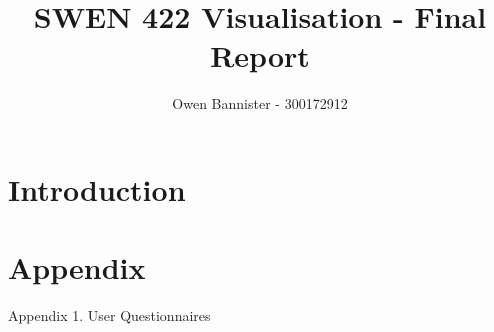 \documentclass[11pt, a4paper]{CRPITStyle}
\title{SWEN 422 Visualisation - Final Report}
\author{Owen Bannister - 300172912}
\begin{document}
\maketitle

\begin{abstract}

\end{abstract}

\section{Introduction}


%
\nocite{*}


\section{Appendix}
Appendix 1. User Questionnaires
\end{document}
